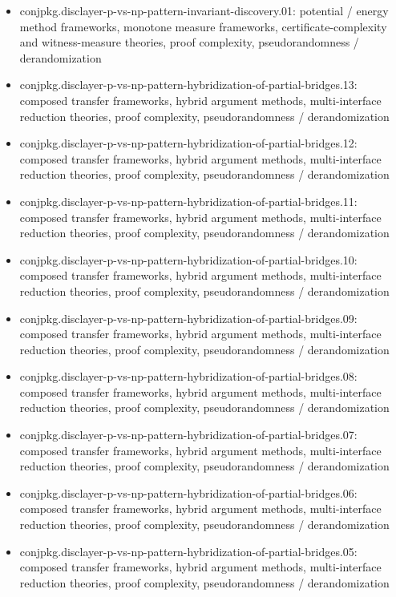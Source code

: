 \documentclass[11pt]{article}
\begin{document}
\begin{itemize}
\item conjpkg.disclayer-p-vs-np-pattern-invariant-discovery.01: potential / energy method frameworks, monotone measure frameworks, certificate-complexity and witness-measure theories, proof complexity, pseudorandomness / derandomization
\item conjpkg.disclayer-p-vs-np-pattern-hybridization-of-partial-bridges.13: composed transfer frameworks, hybrid argument methods, multi-interface reduction theories, proof complexity, pseudorandomness / derandomization
\item conjpkg.disclayer-p-vs-np-pattern-hybridization-of-partial-bridges.12: composed transfer frameworks, hybrid argument methods, multi-interface reduction theories, proof complexity, pseudorandomness / derandomization
\item conjpkg.disclayer-p-vs-np-pattern-hybridization-of-partial-bridges.11: composed transfer frameworks, hybrid argument methods, multi-interface reduction theories, proof complexity, pseudorandomness / derandomization
\item conjpkg.disclayer-p-vs-np-pattern-hybridization-of-partial-bridges.10: composed transfer frameworks, hybrid argument methods, multi-interface reduction theories, proof complexity, pseudorandomness / derandomization
\item conjpkg.disclayer-p-vs-np-pattern-hybridization-of-partial-bridges.09: composed transfer frameworks, hybrid argument methods, multi-interface reduction theories, proof complexity, pseudorandomness / derandomization
\item conjpkg.disclayer-p-vs-np-pattern-hybridization-of-partial-bridges.08: composed transfer frameworks, hybrid argument methods, multi-interface reduction theories, proof complexity, pseudorandomness / derandomization
\item conjpkg.disclayer-p-vs-np-pattern-hybridization-of-partial-bridges.07: composed transfer frameworks, hybrid argument methods, multi-interface reduction theories, proof complexity, pseudorandomness / derandomization
\item conjpkg.disclayer-p-vs-np-pattern-hybridization-of-partial-bridges.06: composed transfer frameworks, hybrid argument methods, multi-interface reduction theories, proof complexity, pseudorandomness / derandomization
\item conjpkg.disclayer-p-vs-np-pattern-hybridization-of-partial-bridges.05: composed transfer frameworks, hybrid argument methods, multi-interface reduction theories, proof complexity, pseudorandomness / derandomization

\end{itemize}
\end{document}

